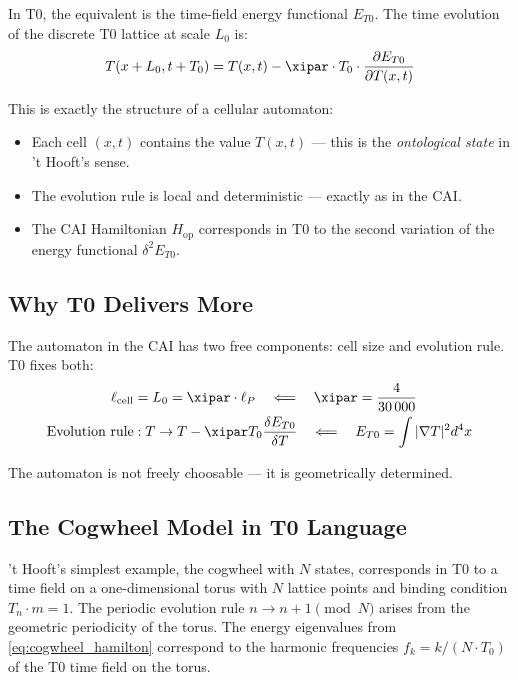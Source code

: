 In T0, the equivalent is the time-field energy functional $E_{T0}$.
The time evolution of the discrete T0 lattice at scale $L_0$ is:
\begin{equation}
    T(x + L_0, t + T_0) = T(x, t) - \xipar \cdot T_0 \cdot
    \frac{\partial E_{T0}}{\partial T(x,t)}
    \label{eq:t0_discrete_evolution}
\end{equation}

This is exactly the structure of a cellular automaton:
\begin{itemize}
    \item Each cell $(x, t)$ contains the value $T(x,t)$ — this is the
    \emph{ontological state} in 't Hooft's sense.
    \item The evolution rule is local and deterministic — exactly as in the CAI.
    \item The CAI Hamiltonian $H_{\text{op}}$ corresponds in T0 to the second
    variation of the energy functional $\delta^2 E_{T0}$.
\end{itemize}

\subsection{Why T0 Delivers More}

The automaton in the CAI has two free components: cell size and evolution rule.
T0 fixes both:
\begin{align}
    \ell_{\text{cell}} &= L_0 = \xipar \cdot \ell_P
    \quad \Longleftarrow \quad \xipar = \frac{4}{30\,000}
    \label{eq:cell_size_fixed} \\
    \text{Evolution rule} &: T \to T - \xipar T_0 \frac{\delta E_{T0}}{\delta T}
    \quad \Longleftarrow \quad E_{T0} = \int |\nabla T|^2 d^4x
    \label{eq:rule_fixed}
\end{align}

The automaton is not freely choosable — it is geometrically determined.

\subsection{The Cogwheel Model in T0 Language}

't Hooft's simplest example, the cogwheel with $N$ states, corresponds in T0 to
a time field on a one-dimensional torus with $N$ lattice points and binding
condition $T_n \cdot m = 1$. The periodic evolution rule $n \to n + 1 \pmod{N}$
arises from the geometric periodicity of the torus. The energy eigenvalues from
\eqref{eq:cogwheel_hamilton} correspond to the harmonic frequencies
$f_k = k/(N \cdot T_0)$ of the T0 time field on the torus.

